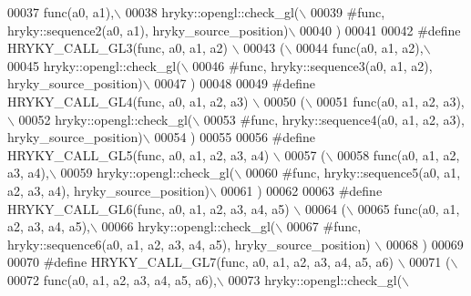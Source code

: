 \begin{DoxyCode}
00037 \textcolor{preprocessor}{     func(a0, a1),\(\backslash\)}
00038 \textcolor{preprocessor}{     hryky::opengl::check\_gl(\(\backslash\)}
00039 \textcolor{preprocessor}{        #func, hryky::sequence2(a0, a1), hryky\_source\_position)\(\backslash\)}
00040 \textcolor{preprocessor}{     )}
00041 \textcolor{preprocessor}{}
00042 \textcolor{preprocessor}{#define HRYKY\_CALL\_GL3(func, a0, a1, a2) \(\backslash\)}
00043 \textcolor{preprocessor}{    (\(\backslash\)}
00044 \textcolor{preprocessor}{     func(a0, a1, a2),\(\backslash\)}
00045 \textcolor{preprocessor}{     hryky::opengl::check\_gl(\(\backslash\)}
00046 \textcolor{preprocessor}{        #func, hryky::sequence3(a0, a1, a2), hryky\_source\_position)\(\backslash\)}
00047 \textcolor{preprocessor}{     )}
00048 \textcolor{preprocessor}{}
00049 \textcolor{preprocessor}{#define HRYKY\_CALL\_GL4(func, a0, a1, a2, a3) \(\backslash\)}
00050 \textcolor{preprocessor}{    (\(\backslash\)}
00051 \textcolor{preprocessor}{     func(a0, a1, a2, a3),\(\backslash\)}
00052 \textcolor{preprocessor}{     hryky::opengl::check\_gl(\(\backslash\)}
00053 \textcolor{preprocessor}{        #func, hryky::sequence4(a0, a1, a2, a3), hryky\_source\_position)\(\backslash\)}
00054 \textcolor{preprocessor}{     )}
00055 \textcolor{preprocessor}{}
00056 \textcolor{preprocessor}{#define HRYKY\_CALL\_GL5(func, a0, a1, a2, a3, a4) \(\backslash\)}
00057 \textcolor{preprocessor}{    (\(\backslash\)}
00058 \textcolor{preprocessor}{     func(a0, a1, a2, a3, a4),\(\backslash\)}
00059 \textcolor{preprocessor}{     hryky::opengl::check\_gl(\(\backslash\)}
00060 \textcolor{preprocessor}{        #func, hryky::sequence5(a0, a1, a2, a3, a4), hryky\_source\_position)\(\backslash\)}
00061 \textcolor{preprocessor}{     )}
00062 \textcolor{preprocessor}{}
00063 \textcolor{preprocessor}{#define HRYKY\_CALL\_GL6(func, a0, a1, a2, a3, a4, a5) \(\backslash\)}
00064 \textcolor{preprocessor}{    (\(\backslash\)}
00065 \textcolor{preprocessor}{     func(a0, a1, a2, a3, a4, a5),\(\backslash\)}
00066 \textcolor{preprocessor}{     hryky::opengl::check\_gl(\(\backslash\)}
00067 \textcolor{preprocessor}{        #func, hryky::sequence6(a0, a1, a2, a3, a4, a5), hryky\_source\_position)
      \(\backslash\)}
00068 \textcolor{preprocessor}{     )}
00069 \textcolor{preprocessor}{}
00070 \textcolor{preprocessor}{#define HRYKY\_CALL\_GL7(func, a0, a1, a2, a3, a4, a5, a6) \(\backslash\)}
00071 \textcolor{preprocessor}{    (\(\backslash\)}
00072 \textcolor{preprocessor}{     func(a0, a1, a2, a3, a4, a5, a6),\(\backslash\)}
00073 \textcolor{preprocessor}{     hryky::opengl::check\_gl(\(\backslash\)}

\end{DoxyCode}
